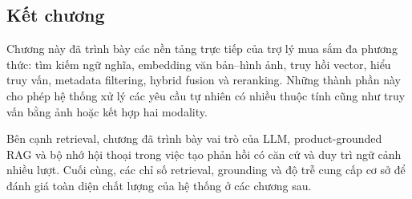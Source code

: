 \subsection*{Kết chương}

Chương này đã trình bày các nền tảng trực tiếp của trợ lý mua sắm đa phương thức: tìm kiếm ngữ nghĩa, embedding văn bản--hình ảnh, truy hồi vector, hiểu truy vấn, metadata filtering, hybrid fusion và reranking. Những thành phần này cho phép hệ thống xử lý các yêu cầu tự nhiên có nhiều thuộc tính cũng như truy vấn bằng ảnh hoặc kết hợp hai modality.

Bên cạnh retrieval, chương đã trình bày vai trò của LLM, product-grounded RAG và bộ nhớ hội thoại trong việc tạo phản hồi có căn cứ và duy trì ngữ cảnh nhiều lượt. Cuối cùng, các chỉ số retrieval, grounding và độ trễ cung cấp cơ sở để đánh giá toàn diện chất lượng của hệ thống ở các chương sau.
